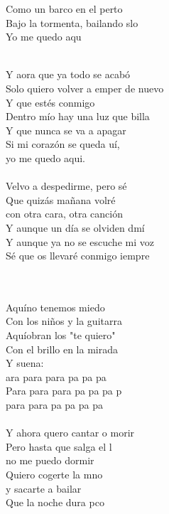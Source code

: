 \begin{cancion}
	Como un barco en el perto\\
	Bajo la tormenta, bailando slo\\
	Yo me quedo aqu \\\jump\\
	\begin{chorus}%
	Y aora que ya todo se acabó\\
	Solo quiero volver a emper de nuevo\\
Y que estés conmigo\\
	Dentro mío hay una luz que billa\\
Y que nunca se va a apagar\\
	Si mi corazón se queda uí, \\
yo me quedo aqui.\\
\jump\\
	Velvo a despedirme, pero sé\\
	Que quizás mañana volré \\
con otra cara, otra canción\\
	Y aunque un día se olviden dmí\\
Y aunque ya no se escuche mi voz\\
	Sé que os llevaré conmigo iempre\\
	\end{chorus}%
	\jump\\
\jump\\
	Aquíno tenemos miedo\\
Con los niños y la guitarra\\
	Aquíobran los "te quiero"\\
Con el brillo en la mirada\\
Y suena:\\
	ara para para pa pa pa\\
	Para para para pa pa pa p\\
para para pa pa pa pa\\
\jump\\
	Y ahora quero cantar o morir\\
	Pero hasta que salga el l \\
no me puedo dormir\\
	Quiero cogerte la mno \\
y sacarte a bailar\\
	Que la noche dura pco \\

\end{cancion}
